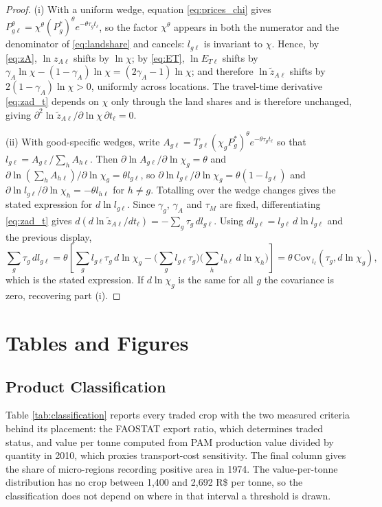 \documentclass[11pt]{article}
\begin{document}
\begin{proof}
(i) With a uniform wedge, equation \eqref{eq:prices_chi} gives $P_{g\ell}^\theta=\chi^\theta (P_g^\ast)^\theta e^{-\theta\tau_g t_\ell}$, so the factor $\chi^\theta$ appears in both the numerator and the denominator of \eqref{eq:landshare} and cancels: $l_{g\ell}$ is invariant to $\chi$. Hence, by \eqref{eq:zA}, $\ln z_{A\ell}$ shifts by $\ln\chi$; by \eqref{eq:ET}, $\ln E_{T\ell}$ shifts by $\gamma_A\ln\chi-(1-\gamma_A)\ln\chi=(2\gamma_A-1)\ln\chi$; and therefore $\ln \tilde z_{A\ell}$ shifts by $2(1-\gamma_A)\ln\chi>0$, uniformly across locations. The travel-time derivative \eqref{eq:zad_t} depends on $\chi$ only through the land shares and is therefore unchanged, giving $\partial^2 \ln\tilde z_{A\ell}/\partial\ln\chi\,\partial t_\ell = 0$.

(ii) With good-specific wedges, write $A_{g\ell}=T_{g\ell}(\chi_g P_g^\ast)^\theta e^{-\theta\tau_g t_\ell}$ so that $l_{g\ell}=A_{g\ell}/\sum_h A_{h\ell}$. Then $\partial\ln A_{g\ell}/\partial\ln\chi_g=\theta$ and $\partial\ln\left(\sum_h A_{h\ell}\right)/\partial\ln\chi_g=\theta l_{g\ell}$, so $\partial \ln l_{g\ell}/\partial\ln\chi_g=\theta(1-l_{g\ell})$ and $\partial \ln l_{g\ell}/\partial\ln\chi_h=-\theta l_{h\ell}$ for $h\neq g$. Totalling over the wedge changes gives the stated expression for $d\ln l_{g\ell}$. Since $\gamma_g$, $\gamma_A$ and $\tau_M$ are fixed, differentiating \eqref{eq:zad_t} gives $d(d \ln \tilde z_{A\ell}/dt_\ell) = -\sum_g \tau_g\, d l_{g\ell}$. Using $d l_{g\ell}=l_{g\ell}\,d\ln l_{g\ell}$ and the previous display,
\[
\sum_g \tau_g\, d l_{g\ell}
= \theta\left[\sum_g l_{g\ell}\tau_g\, d\ln\chi_g - \Big(\sum_g l_{g\ell}\tau_g\Big)\Big(\sum_h l_{h\ell}\, d\ln\chi_h\Big)\right]
= \theta\,\mathrm{Cov}_{\,l_\ell}\!\left(\tau_g, d\ln\chi_g\right),
\]
which is the stated expression. If $d\ln\chi_g$ is the same for all $g$ the covariance is zero, recovering part (i).
\end{proof}

\newpage
\section{Tables and Figures}
\label{app:tabfig}

\subsection{Product Classification}
\label{app:classification}

Table \ref{tab:classification} reports every traded crop with the two measured criteria behind its placement: the FAOSTAT export ratio, which determines traded status, and value per tonne computed from PAM production value divided by quantity in 2010, which proxies transport-cost sensitivity. The final column gives the share of micro-regions recording positive area in 1974. The value-per-tonne distribution has no crop between 1,400 and 2,692 R\$ per tonne, so the classification does not depend on where in that interval a threshold is drawn.
\end{document}
